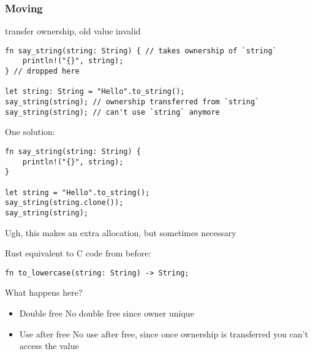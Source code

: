 \documentclass[11pt]{article}
\begin{document}
\subsubsection*{Moving}
\label{sec:org588c1b0}
transfer ownership, old value invalid

\begin{verbatim}
fn say_string(string: String) { // takes ownership of `string`
    println!("{}", string);
} // dropped here

let string: String = "Hello".to_string();
say_string(string); // ownership transferred from `string`
say_string(string); // can't use `string` anymore
\end{verbatim}

One solution:
\begin{verbatim}
fn say_string(string: String) {
    println!("{}", string);
}

let string = "Hello".to_string();
say_string(string.clone());
say_string(string);
\end{verbatim}
Ugh, this makes an extra allocation, but sometimes necessary


Rust equivalent to C code from before:
\begin{verbatim}
fn to_lowercase(string: String) -> String;
\end{verbatim}
What happens here?

\begin{itemize}
\item Double free
\label{sec:orgd3084c8}
No double free since owner unique

\item Use after free
\label{sec:org67060b6}
No use after free, since once ownership is transferred you can't access the value



\newpage
\end{itemize}
\end{document}
